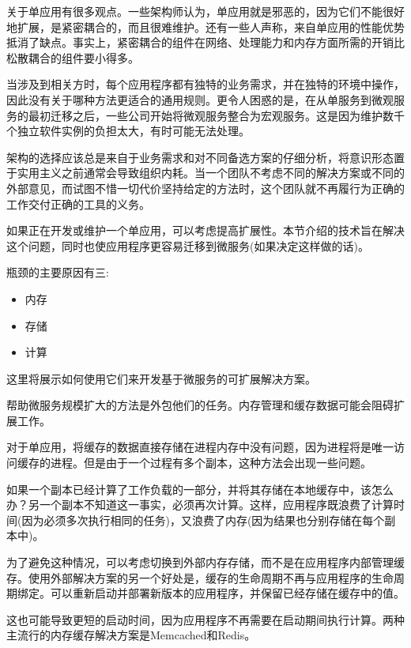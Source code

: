 

关于单应用有很多观点。一些架构师认为，单应用就是邪恶的，因为它们不能很好地扩展，是紧密耦合的，而且很难维护。还有一些人声称，来自单应用的性能优势抵消了缺点。事实上，紧密耦合的组件在网络、处理能力和内存方面所需的开销比松散耦合的组件要小得多。

当涉及到相关方时，每个应用程序都有独特的业务需求，并在独特的环境中操作，因此没有关于哪种方法更适合的通用规则。更令人困惑的是，在从单服务到微观服务的最初迁移之后，一些公司开始将微观服务整合为宏观服务。这是因为维护数千个独立软件实例的负担太大，有时可能无法处理。

架构的选择应该总是来自于业务需求和对不同备选方案的仔细分析，将意识形态置于实用主义之前通常会导致组织内耗。当一个团队不考虑不同的解决方案或不同的外部意见，而试图不惜一切代价坚持给定的方法时，这个团队就不再履行为正确的工作交付正确的工具的义务。

如果正在开发或维护一个单应用，可以考虑提高扩展性。本节介绍的技术旨在解决这个问题，同时也使应用程序更容易迁移到微服务(如果决定这样做的话)。

瓶颈的主要原因有三:

\begin{itemize}
\item 
内存

\item 
存储

\item 
计算
\end{itemize}

这里将展示如何使用它们来开发基于微服务的可扩展解决方案。


帮助微服务规模扩大的方法是外包他们的任务。内存管理和缓存数据可能会阻碍扩展工作。

对于单应用，将缓存的数据直接存储在进程内存中没有问题，因为进程将是唯一访问缓存的进程。但是由于一个过程有多个副本，这种方法会出现一些问题。

如果一个副本已经计算了工作负载的一部分，并将其存储在本地缓存中，该怎么办？另一个副本不知道这一事实，必须再次计算。这样，应用程序既浪费了计算时间(因为必须多次执行相同的任务)，又浪费了内存(因为结果也分别存储在每个副本中)。

为了避免这种情况，可以考虑切换到外部内存存储，而不是在应用程序内部管理缓存。使用外部解决方案的另一个好处是，缓存的生命周期不再与应用程序的生命周期绑定。可以重新启动并部署新版本的应用程序，并保留已经存储在缓存中的值。

这也可能导致更短的启动时间，因为应用程序不再需要在启动期间执行计算。两种主流行的内存缓存解决方案是Memcached和Redis。

